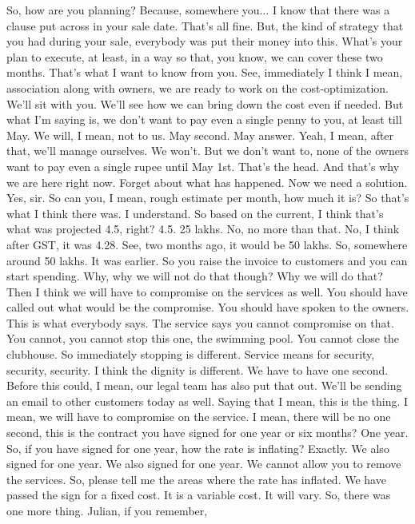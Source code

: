 So, how are you planning?
Because,
somewhere you...
I know that there was
a clause put across
in your sale date.
That's all fine.
But,
the kind of strategy
that you had during your sale,
everybody was put
their money into this.
What's your plan
to execute, at least,
in a way so that, you know,
we can cover these two months.
That's what I want to know from you.
See,
immediately I think
I mean,
association along with
owners, we are ready to
work on the cost-optimization.
We'll sit with you.
We'll see how we can
bring down the cost even if
needed.
But what I'm saying is,
we don't want to pay
even a single penny
to you,
at least till May.
We will, I mean,
not to us.
May second.
May answer.
Yeah, I mean,
after that,
we'll manage ourselves.
We won't.
But we don't want to,
none of the owners
want to pay even a single
rupee until May 1st.
That's the
head.
And that's why we are here
right now.
Forget about what has
happened.
Now we need a solution.
Yes, sir.
So can you,
I mean,
rough estimate per month,
how much it is?
So that's what I think
there was.
I understand.
So based on the current,
I think that's what was
projected 4.5, right?
4.5.
25 lakhs.
No,
no more than that.
No,
I think after GST,
it was 4.28.
See,
two months ago,
it would be 50 lakhs.
So,
somewhere around 50 lakhs.
It was earlier.
So you raise the invoice
to customers
and you can start spending.
Why,
why we will not do that though?
Why we will do that?
Then I think
we will have to compromise
on the services as well.
You should have called
out what would be the compromise.
You should have spoken to
the owners.
This is what everybody
says.
The service says
you cannot compromise on that.
You cannot,
you cannot stop
this one,
the swimming pool.
You cannot close
the clubhouse.
So immediately
stopping is different.
Service means for
security,
security,
security.
I think the
dignity is different.
We have
to have
one second.
Before this could,
I mean,
our legal team
has also put that out.
We'll be sending an email
to other customers today as well.
Saying that I mean,
this is the thing.
I mean,
we will have to compromise on the service.
I mean,
there will be
no one second,
this is the
contract you have signed
for one year or six months?
One year.
So,
if you have signed for one year,
how the rate is inflating?
Exactly.
We also signed for one year.
We also signed for one year.
We cannot
allow you to
remove the services.
So,
please tell me the areas
where the rate has inflated.
We have
passed the
sign for a fixed cost.
It is a variable cost.
It will vary.
So,
there was one more thing.
Julian,
if you remember,
